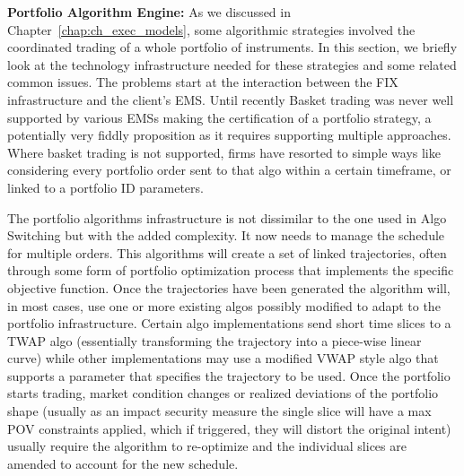 \noindent\textbf{Portfolio Algorithm Engine:} As we discussed in Chapter~\ref{chap:ch_exec_models}, some algorithmic strategies involved the coordinated trading of a whole portfolio of instruments. In this section, we briefly look at the technology infrastructure needed for these strategies and some related common issues. The problems start at the interaction between the FIX infrastructure and the client's EMS. Until recently Basket trading was never well supported by various EMSs making the certification of a portfolio strategy, a potentially very fiddly proposition as it requires supporting multiple approaches. Where basket trading is not supported, firms have resorted to simple ways like considering every portfolio order sent to that algo within a certain timeframe, or linked to a portfolio ID parameters. 


The portfolio algorithms infrastructure is not dissimilar to the one used in Algo Switching but with the added complexity. It now needs to manage the schedule for multiple orders. This algorithms will create a set of linked trajectories, often through some form of portfolio optimization process that implements the specific objective function. Once the trajectories have been generated the algorithm will, in most cases, use one or more existing  algos possibly modified to adapt to the portfolio infrastructure.  Certain algo implementations send short time slices to a TWAP algo (essentially transforming the trajectory into a piece-wise linear curve) while other implementations may use a modified VWAP style algo that supports a parameter that specifies the trajectory to be used. Once the portfolio starts trading, market condition changes or realized deviations of the portfolio shape (usually as an impact security measure the single slice will have a max POV constraints applied, which if triggered, they will distort the original intent) usually require the algorithm to re-optimize and the individual slices are amended to account for the new schedule.


